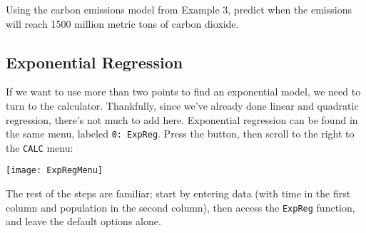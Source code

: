 \begin{try}
Using the carbon emissions model from Example 3, predict when the emissions will reach 1500 million metric tons of carbon dioxide.
\end{try}
\pagebreak

\subsection{Exponential Regression}
If we want to use more than two points to find an exponential model, we need to turn to the calculator.  Thankfully, since we've already done linear and quadratic regression, there's not much to add here.  Exponential regression can be found in the same menu, labeled \texttt{0: ExpReg}.  Press the  button, then scroll to the right to the \texttt{CALC} menu:
\begin{center}
\texttt{[image: ExpRegMenu]}
\end{center}

The rest of the steps are familiar; start by entering data (with time in the first column and population in the second column), then access the \texttt{ExpReg} function, and leave the default options alone.

